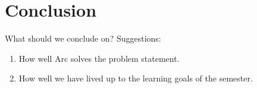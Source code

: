 \chapter{Conclusion}\label{cha:conclusion}
What should we conclude on? Suggestions:

\begin{enumerate}
    \item How well Arc solves the problem statement.
    \item How well we have lived up to the learning goals of the semester.
\end{enumerate}